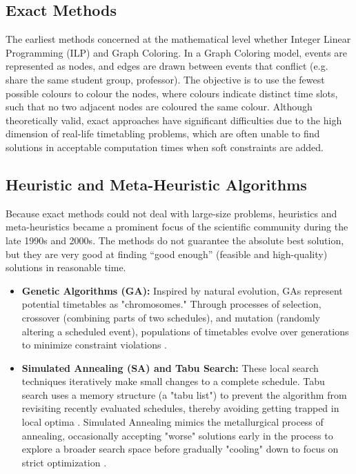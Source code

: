 \subsection{Exact Methods}
The earliest methods concerned at the mathematical level whether Integer Linear Programming (ILP) and Graph Coloring. In a Graph Coloring model, events are represented as nodes, and edges are drawn between events that conflict (e.g. share the same student group, professor).  The objective is to use the fewest possible colours to colour the nodes, where colours indicate distinct time slots, such that no two adjacent nodes are coloured the same colour. Although theoretically valid, exact approaches have significant difficulties due to the high dimension of real-life timetabling problems, which are often unable to find solutions in acceptable computation times when soft constraints are added.

\subsection{Heuristic and Meta-Heuristic Algorithms}
Because exact methods could not deal with large-size problems, heuristics and meta-heuristics became a prominent focus of the scientific community during the late 1990s and 2000s. The methods do not guarantee the absolute best solution, but they are very good at finding “good enough” (feasible and high-quality) solutions in reasonable time.

\begin{itemize}
    \item \textbf{Genetic Algorithms (GA):} Inspired by natural evolution, GAs represent potential timetables as "chromosomes." Through processes of selection, crossover (combining parts of two schedules), and mutation (randomly altering a scheduled event), populations of timetables evolve over generations to minimize constraint violations \cite{burke1996genetic}.
    \item \textbf{Simulated Annealing (SA) and Tabu Search:} These local search techniques iteratively make small changes to a complete schedule. Tabu search uses a memory structure (a "tabu list") to prevent the algorithm from revisiting recently evaluated schedules, thereby avoiding getting trapped in local optima \cite{glover1997tabu}. Simulated Annealing mimics the metallurgical process of annealing, occasionally accepting "worse" solutions early in the process to explore a broader search space before gradually "cooling" down to focus on strict optimization \cite{kirkpatrick1983optimization}.
\end{itemize}

